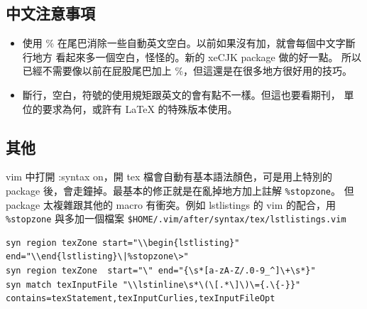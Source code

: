 \subsection{中文注意事項}
\begin{itemize}
\item 使用 \% 在尾巴消除一些自動英文空白。以前如果沒有加，就會每個中文字斷行地方
看起來多一個空白，怪怪的。新的 xeCJK package 做的好一點。
所以已經不需要像以前在屁股尾巴加上 \%，但這還是在很多地方很好用的技巧。
\item 斷行，空白，符號的使用規矩跟英文的會有點不一樣。但這也要看期刊，
單位的要求為何，或許有 {\LaTeX} 的特殊版本使用。
\end{itemize}

\subsection{其他}
vim 中打開 :syntax on，開 tex 檔會自動有基本語法顏色，可是用上特別的
 package 後，會走鐘掉。最基本的修正就是在亂掉地方加上註解 
\verb=%stopzone=。 但 package 太複雜跟其他的 macro 有衝突。例如 lstlistings
的 vim 的配合，用 \verb=%stopzone= 與多加一個檔案
\verb=$HOME/.vim/after/syntax/tex/lstlistings.vim=
\begin{footnotesize}
\begin{verbatim}
syn region texZone start="\\begin{lstlisting}" end="\\end{lstlisting}\|%stopzone\>"
syn region texZone  start="\" end="{\s*[a-zA-Z/.0-9_^]\+\s*}"
syn match texInputFile "\\lstinline\s*\(\[.*\]\)\={.\{-}}" contains=texStatement,texInputCurlies,texInputFileOpt
\end{verbatim}
\end{footnotesize}
\clearpage
